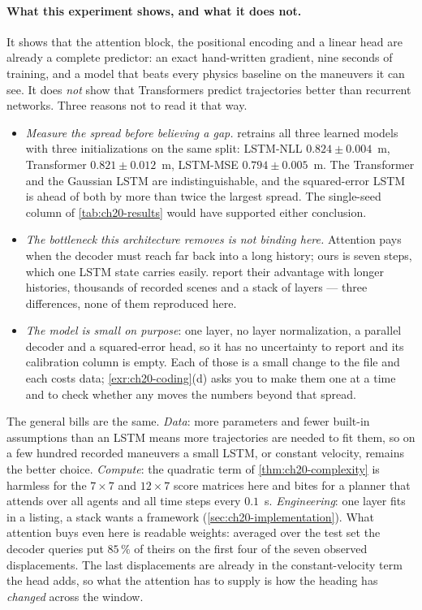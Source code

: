 \paragraph{What this experiment shows, and what it does not.}
It shows that the attention block, the positional encoding and a linear head
are already a complete predictor: an exact hand-written gradient, nine
seconds of training, and a model that beats every physics baseline on the
maneuvers it can see. It does \emph{not} show that Transformers predict
trajectories better than recurrent networks. Three reasons not to read it
that way.
\begin{itemize}
  \item \emph{Measure the spread before believing a gap.}
   retrains all three learned models with three
  initializations on the same split: LSTM-NLL $0.824 \pm 0.004$~m,
  Transformer $0.821 \pm 0.012$~m, LSTM-MSE $0.794 \pm 0.005$~m. The
  Transformer and the Gaussian LSTM are indistinguishable, and the
  squared-error LSTM is ahead of both by more than twice the largest spread.
  The single-seed column of \cref{tab:ch20-results} would have supported
  either conclusion.
  \item \emph{The bottleneck this architecture removes is not binding here.}
  Attention pays when the decoder must reach far back into a long history;
  ours is seven steps, which one LSTM state carries easily.
  \textcite{giuliari2021transformer} report their advantage with longer
  histories, thousands of recorded scenes and a stack of layers --- three
  differences, none of them reproduced here.
  \item \emph{The model is small on purpose}: one layer, no layer
  normalization, a parallel decoder and a squared-error head, so it has no
  uncertainty to report and its calibration column is empty. Each of those is
  a small change to the file and each costs data; \cref{exr:ch20-coding}(d)
  asks you to make them one at a time and to check whether any moves the
  numbers beyond that spread.
\end{itemize}
The general bills are the same. \emph{Data}: more parameters and fewer
built-in assumptions than an LSTM means more trajectories are needed to fit
them, so on a few hundred recorded maneuvers a small LSTM, or constant
velocity, remains the better choice. \emph{Compute}: the quadratic term of
\cref{thm:ch20-complexity} is harmless for the $7 \times 7$ and $12 \times 7$
score matrices here and bites for a planner that attends over all agents and
all time steps every $0.1$~s. \emph{Engineering}: one layer fits in a
listing, a stack wants a framework (\cref{sec:ch20-implementation}). What
attention buys even here is readable weights: averaged over the test set the
decoder queries put $85\,\%$ of theirs on the first four of the seven
observed displacements. The last displacements are already in the
constant-velocity term the head adds, so what the attention has to supply is
how the heading has \emph{changed} across the window.

